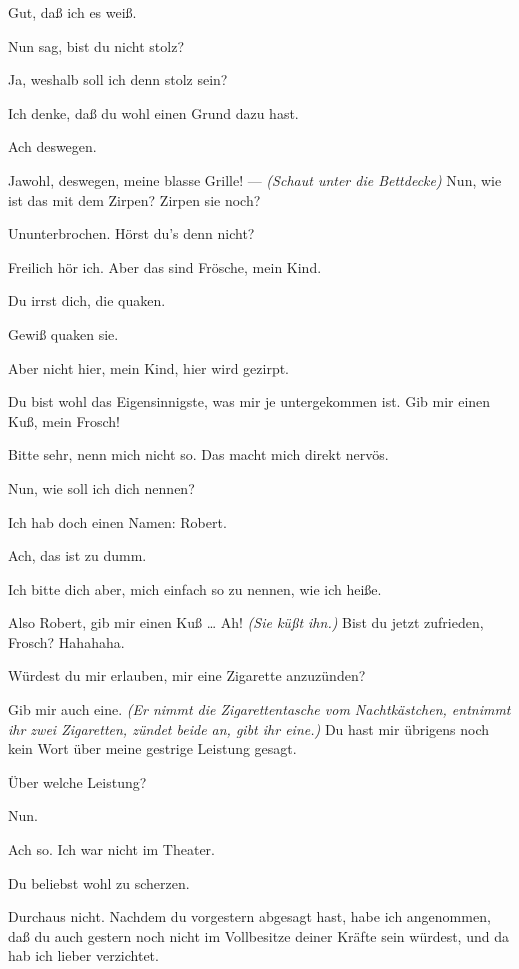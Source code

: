 \documentclass[
	final,
	a4paper,
	ngerman,
	mpinclude = true, %
	twoside = true,
	open = right,
	cleardoublepage = plain,
	DIV = 13,
	BCOR = 1cm,
	titlepage = firstiscover,
	]{scrbook}
\newcommand{\direction}[1]{\textit{(#1)}}
\newcommand{\thecharacter}[1]{\textup{\textsc{#1}}\xspace}
\newcommand{\thedichter}{\thecharacter{Robert Bibitz}}
\newcommand{\theschauspielerin}{\thecharacter{Daniela}}
\newcommand{\character}[1]{\item[#1:]}
\newcommand{\dichter}{\character{\thedichter}}
\newcommand{\schauspielerin}{\character{\theschauspielerin}}
\begin{document}
\begin{play}
	\dichter
	Gut, daß ich es weiß.

	\schauspielerin
	Nun sag, bist du nicht stolz?

	\dichter
	Ja, weshalb soll ich denn stolz sein?

	\schauspielerin
	Ich denke, daß du wohl einen Grund dazu hast.

	\dichter
	Ach deswegen.

	\schauspielerin
	Jawohl, deswegen, meine blasse Grille! --- \direction{Schaut unter die Bettdecke} Nun, wie ist das mit dem Zirpen? Zirpen sie noch?

	\dichter
	Ununterbrochen. Hörst du's denn nicht?

	\schauspielerin
	Freilich hör ich. Aber das sind Frösche, mein Kind.

	\dichter
	Du irrst dich, die quaken.

	\schauspielerin
	Gewiß quaken sie.

	\dichter
	Aber nicht hier, mein Kind, hier wird gezirpt.

	\schauspielerin
	Du bist wohl das Eigensinnigste, was mir je untergekommen ist. Gib mir einen Kuß, mein Frosch!

	\dichter
	Bitte sehr, nenn mich nicht so. Das macht mich direkt nervös.

	\schauspielerin
	Nun, wie soll ich dich nennen?

	\dichter
	Ich hab doch einen Namen: Robert.

	\schauspielerin
	Ach, das ist zu dumm.

	\dichter
	Ich bitte dich aber, mich einfach so zu nennen, wie ich heiße.

	\schauspielerin
	Also Robert, gib mir einen Kuß \ldots{} Ah! \direction{Sie küßt ihn.} Bist du jetzt zufrieden, Frosch? Hahahaha.

	\dichter
	Würdest du mir erlauben, mir eine Zigarette anzuzünden?

	\schauspielerin
	Gib mir auch eine.  \direction{Er nimmt die Zigarettentasche vom Nachtkästchen, entnimmt ihr zwei Zigaretten, zündet beide an, gibt ihr eine.} Du hast mir übrigens noch kein Wort über meine gestrige Leistung gesagt.

	\dichter
	Über welche Leistung?

	\schauspielerin
	Nun.

	\dichter
	Ach so. Ich war nicht im Theater.

	\schauspielerin
	Du beliebst wohl zu scherzen.

	\dichter
	Durchaus nicht. Nachdem du vorgestern abgesagt hast, habe ich angenommen, daß du auch gestern noch nicht im Vollbesitze deiner Kräfte sein würdest, und da hab ich lieber verzichtet.


\end{play}
\end{document}
